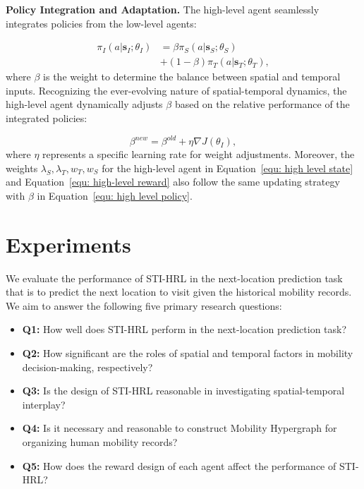 \documentclass[letterpaper]{article} %
\begin{document}
\noindent \textbf{Policy Integration and Adaptation.} The high-level agent seamlessly integrates policies from the low-level agents:

\begin{align}
 \pi_{I}(a|\mathbf{s}_{I};\theta_{I}) &= \beta \pi_S(a|\mathbf{s}_S;\theta_S) \nonumber \\
 &+ (1-\beta) \pi_T(a|\mathbf{s}_T; \theta_T),
\end{align}
where $ \beta $ is the weight to determine the balance between spatial and temporal inputs. Recognizing the ever-evolving nature of spatial-temporal dynamics, the high-level agent dynamically adjusts $ \beta $ based on the relative performance of the integrated policies:


\begin{equation}
    \beta^{new} = \beta^{old} + \eta \nabla J(\theta_{I}),
    \label{equ: high level policy}
\end{equation}
where $ \eta $ represents a specific learning rate for weight adjustments.
Moreover, the weights $\lambda_S, \lambda_T, w_T, w_S$ for the high-level agent in Equation~\ref{equ: high level state} and Equation~\ref{equ: high-level reward} also follow the same updating strategy with $\beta$ in Equation~\ref{equ: high level policy}.


\section{Experiments}
We evaluate the performance of STI-HRL in the next-location prediction task that is to predict the next location to visit given the historical mobility records.
We aim to answer the following five primary research questions:

\begin{itemize}
    \item \textbf{Q1:} How well does STI-HRL perform in the next-location prediction task?
    \item \textbf{Q2:} How significant are the roles of spatial and temporal factors in mobility decision-making, respectively?
    \item \textbf{Q3:} Is the design of STI-HRL reasonable in investigating spatial-temporal interplay?
    \item \textbf{Q4:} Is it necessary and reasonable to construct Mobility Hypergraph for organizing human mobility records?
    \item \textbf{Q5:} How does the reward design  of each agent affect the performance of STI-HRL?
\end{itemize}
\end{document}

